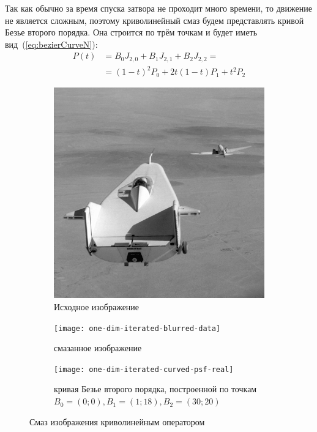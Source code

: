 Так как обычно за время спуска затвора не проходит много времени, то движение не является сложным, поэтому криволинейный смаз будем представлять кривой Безье второго порядка. Она строится по трём точкам и будет иметь вид~(\ref{eq:bezierCurveN}):
\begin{equation}
	\begin{aligned}
	P(t) & = B_0 J_{2,0} + B_1 J_{2,1} + B_2 J_{2,2} = \\
		 & = (1-t)^2 P_0 + 2t(1-t)P_1+t^2 P_2
	\end{aligned}
	\label{eq:bezierCurve2}
\end{equation}
\begin{figure}[h!]
	\begin{subfigure}[t]{0.3\textwidth}
		\includegraphics[width=\linewidth]{../liftingbody}
		\caption{Исходное изображение}
		\label{fig:liftingCurvedOriginal}
	\end{subfigure}
	\hfill
	\begin{subfigure}[t]{0.3\textwidth}
		\texttt{[image: one-dim-iterated-blurred-data]}
		\caption{смазанное изображение}
		\label{fig:liftingCurvedBlurred}
	\end{subfigure}
	\hfill
	\begin{subfigure}[t]{0.3\textwidth}
		\texttt{[image: one-dim-iterated-curved-psf-real]}
		\caption{кривая Безье второго порядка, построенной по точкам $B_0=(0; 0), B_1=(1; 18), B_2=(30; 20)$}
		\label{fig:curvedPsf}
	\end{subfigure}
	\caption{Смаз изображения криволинейным оператором}
\end{figure}

